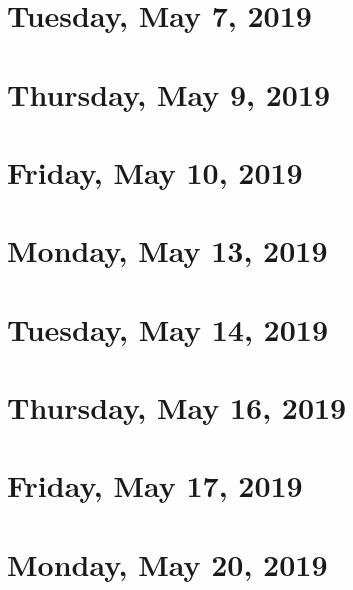 \documentclass[reqno]{amsart}
\begin{document}
\section{Tuesday, May 7, 2019}
    
\section{Thursday, May 9, 2019}
    
\section{Friday, May 10, 2019}
    
    
\section{Monday, May 13, 2019}
    
\section{Tuesday, May 14, 2019}
    
\section{Thursday, May 16, 2019}
    
\section{Friday, May 17, 2019}
    

\section{Monday, May 20, 2019}
    
\end{document}
